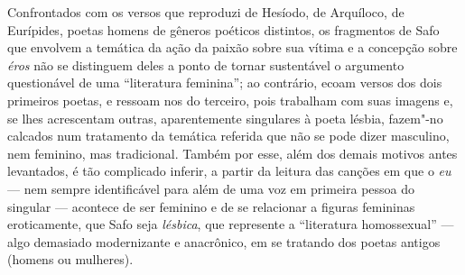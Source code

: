Confrontados com os versos que reproduzi de Hesíodo, de Arquíloco, de Eurípides,
poetas homens de gêneros poéticos distintos, os fragmentos de Safo que envolvem
a temática da ação da paixão sobre sua vítima e a concepção sobre \emph{éros}
não se distinguem deles a ponto de tornar sustentável o argumento questionável
de uma “literatura feminina”; ao contrário, ecoam versos
dos dois primeiros poetas, e ressoam nos do terceiro, pois trabalham com
suas imagens e, se lhes acrescentam outras, aparentemente singulares à poeta
lésbia, fazem"-no calcados num tratamento da temática referida que não se pode
dizer masculino, nem feminino, mas tradicional. Também por esse, além dos demais motivos antes levantados, é tão complicado
inferir, a partir da leitura das canções em que o \emph{eu} --- nem sempre
identificável para além de uma voz em primeira pessoa do singular --- acontece de ser
feminino e de se relacionar a figuras femininas eroticamente, que Safo seja
\emph{lésbica}, que represente a “literatura homossexual” --- algo
demasiado modernizante e anacrônico, em se tratando dos poetas antigos
(homens ou mulheres).

